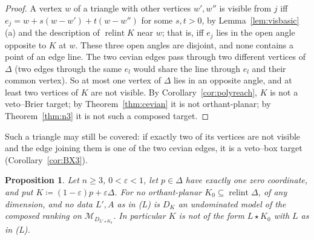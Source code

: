 \documentclass[11pt]{article}
\newcommand{\M}{\mathcal{M}}
\DeclareMathOperator{\relint}{relint}
\theoremstyle{plain}
\newtheorem{proposition}[theorem]{Proposition}
\theoremstyle{definition}
\theoremstyle{remark}
\begin{document}
\begin{proof}
A vertex $w$ of a triangle with other vertices $w',w''$ is visible from $j$ iff
$e_j=w+s(w-w')+t(w-w'')$ for some $s,t>0$, by Lemma~\ref{lem:visbasic}(a) and the
description of $\relint K$ near $w$; that is, iff $e_j$ lies in the open angle opposite to
$K$ at $w$. These three open angles are disjoint, and none contains a point of an edge line.
The two cevian edges pass through two different vertices of $\Delta$ (two edges through
the same $e_l$ would share the line through $e_l$ and their common vertex). So at most one
vertex of $\Delta$ lies in an opposite angle, and at least two vertices of $K$ are not
visible. By Corollary~\ref{cor:polyreach}, $K$ is not a veto--Brier target; by
Theorem~\ref{thm:cevian} it is not orthant-planar; by Theorem~\ref{thm:n3} it is not such a
composed target.
\end{proof}

Such a triangle may still be covered: if exactly two of its vertices are not visible and
the edge joining them is one of the two cevian edges, it is a veto--box target
(Corollary~\ref{cor:BX3}).

\begin{proposition}\label{prop:ZC}
Let $n\ge3$, $0<\varepsilon<1$, let $p\in\Delta$ have exactly one zero coordinate, and put
$K\coloneqq(1-\varepsilon)p+\varepsilon\Delta$. For no orthant-planar $K_0\subseteq
\relint\Delta$, of any dimension, and no data $L',A$ as in (L) is $D_K$ an undominated model
of the composed ranking on $\M_{D_{L'\star K_0}}$. In particular $K$ is not of the form
$L\star K_0$ with $L$ as in (L).
\end{proposition}
\end{document}
